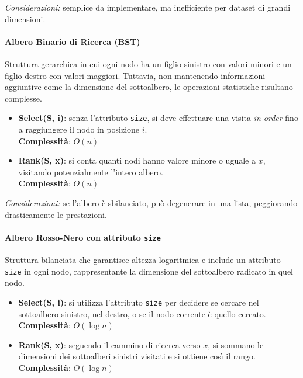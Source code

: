 \documentclass[10pt]{article}
\begin{document}
\noindent \textit{Considerazioni:} semplice da implementare, ma inefficiente per dataset di grandi dimensioni.

\vspace{0.5cm}

\paragraph{Albero Binario di Ricerca (BST)}
Struttura gerarchica in cui ogni nodo ha un figlio sinistro con valori minori e un figlio destro con valori maggiori. Tuttavia, non mantenendo informazioni aggiuntive come la dimensione del sottoalbero, le operazioni statistiche risultano complesse.

\begin{itemize}
    \item \textbf{Select(S, i)}: senza l’attributo \texttt{size}, si deve effettuare una visita \textit{in-order} fino a raggiungere il nodo in posizione $i$. \\
    \textbf{Complessità}: $O(n)$
    
    \item \textbf{Rank(S, x)}: si conta quanti nodi hanno valore minore o uguale a $x$, visitando potenzialmente l’intero albero. \\
    \textbf{Complessità}: $O(n)$
\end{itemize}

\noindent \textit{Considerazioni:} se l’albero è sbilanciato, può degenerare in una lista, peggiorando drasticamente le prestazioni.

\vspace{0.5cm}

\paragraph{Albero Rosso-Nero con attributo \texttt{size}}
Struttura bilanciata che garantisce altezza logaritmica e include un attributo \texttt{size} in ogni nodo, rappresentante la dimensione del sottoalbero radicato in quel nodo.

\begin{itemize}
    \item \textbf{Select(S, i)}: si utilizza l’attributo \texttt{size} per decidere se cercare nel sottoalbero sinistro, nel destro, o se il nodo corrente è quello cercato. \\
    \textbf{Complessità}: $O(\log n)$
    
    \item \textbf{Rank(S, x)}: seguendo il cammino di ricerca verso $x$, si sommano le dimensioni dei sottoalberi sinistri visitati e si ottiene così il rango. \\
    \textbf{Complessità}: $O(\log n)$
\end{itemize}
\end{document}
